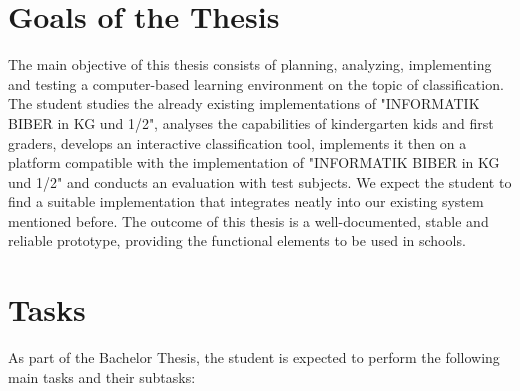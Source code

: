 \documentclass[a4paper,oneside,11pt,final]{scrartcl}
\begin{document}
\section*{Goals of the Thesis}
The main objective of this thesis consists of planning, analyzing, implementing
and testing a computer-based learning environment on the topic of
classification. The student studies the already existing implementations of
"INFORMATIK BIBER in KG und 1/2", analyses the capabilities of kindergarten kids
and first graders, develops an interactive classification tool, implements it
then on a platform compatible with the implementation of "INFORMATIK BIBER in KG
und 1/2" and conducts an evaluation with test subjects. We expect the student to
find a suitable implementation that integrates neatly into our existing system
mentioned before. The outcome of this thesis is a well-documented, stable and
reliable prototype, providing the functional elements to be used in schools.

\newpage

\section*{Tasks}
As part of the Bachelor Thesis, the student is expected to perform the following
main tasks and their subtasks:
\end{document}

